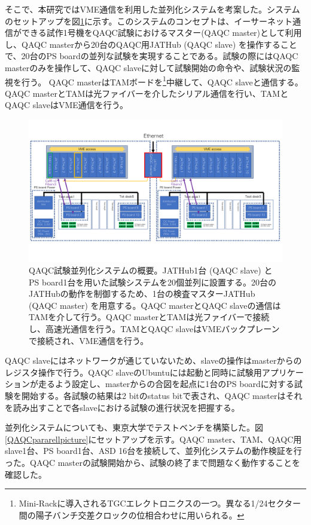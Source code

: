 そこで、本研究ではVME通信を利用した並列化システムを考案した。システムのセットアップを図\ref{QAQCpararell}に示す。このシステムのコンセプトは、イーサーネット通信ができる試作1号機をQAQC試験におけるマスター(QAQC master)として利用し、QAQC masterから20台のQAQC用JATHub (QAQC slave) を操作することで、20台のPS boardの並列な試験を実現することである。試験の際にはQAQC masterのみを操作して、QAQC slaveに対して試験開始の命令や、試験状況の監視を行う。
QAQC masterはTAMボードを\footnote{Mini-Rackに導入されるTGCエレクトロニクスの一つ。異なる1/24セクター間の陽子バンチ交差クロックの位相合わせに用いられる。}中継して、QAQC slaveと通信する。QAQC masterとTAMは光ファイバーを介したシリアル通信を行い、TAMとQAQC slaveはVME通信を行う。

\begin{figure} 
    \centering
    \includegraphics[width=16cm]{fig/QAQC/QAQCpararell.pdf}
    \caption[並列化システムの概要]{QAQC試験並列化システムの概要。JATHub1台 (QAQC slave) とPS board1台を用いた試験システムを20個並列に設置する。20台のJATHubの動作を制御するため、1台の検査マスターJATHub (QAQC master) を用意する。QAQC masterとQAQC slaveの通信はTAMを介して行う。QAQC masterとTAMは光ファイバーで接続し、高速光通信を行う。TAMとQAQC slaveはVMEバックプレーンで接続され、VME通信を行う。}
    \label{QAQCpararell}
\end{figure}

QAQC slaveにはネットワークが通じていないため、slaveの操作はmasterからのレジスタ操作で行う。QAQC slaveのUbuntuには起動と同時に試験用アプリケーションが走るよう設定し、masterからの合図を起点に1台のPS boardに対する試験を開始する。各試験の結果は2 bitのstatus bitで表され、QAQC masterはそれを読み出すことで各slaveにおける試験の進行状況を把握する。

並列化システムについても、東京大学でテストベンチを構築した。図\ref{QAQCpararellpicture}にセットアップを示す。QAQC master、TAM、QAQC用 slave1台、PS board1台、ASD 16台を接続して、並列化システムの動作検証を行った。QAQC masterの試験開始から、試験の終了まで問題なく動作することを確認した。

